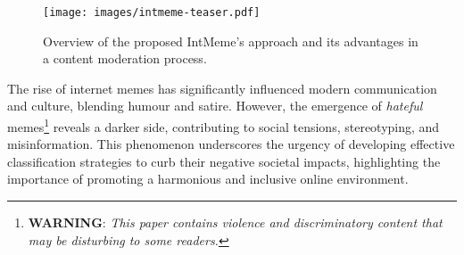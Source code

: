 \begin{figure}[t!]
\centering
\texttt{[image: images/intmeme-teaser.pdf]}
\caption{Overview of the proposed \textsf{IntMeme}'s approach and its advantages in a content moderation process.}
\label{fig:intmeme-teaser}
\end{figure}

The rise of internet memes has significantly influenced modern communication and culture, blending humour and satire. However, the emergence of \textit{hateful} memes\footnote{\color{red}\textbf{WARNING}: \textit{This paper contains violence and discriminatory content that may be disturbing to some readers.}} reveals a darker side, contributing to social tensions, stereotyping, and misinformation. This phenomenon underscores the urgency of developing effective classification strategies to curb their negative societal impacts, highlighting the importance of promoting a harmonious and inclusive online environment.




